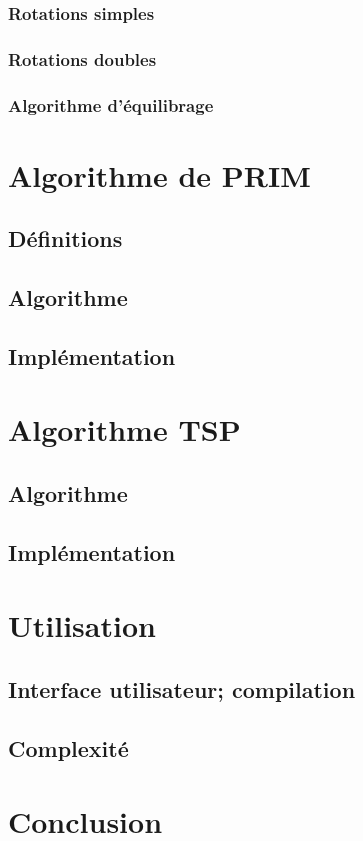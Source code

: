 \documentclass{article}
\begin{document}
\subsubsection{Rotations simples}

\subsubsection{Rotations doubles}

\subsubsection{Algorithme d'équilibrage}

\section{Algorithme de PRIM}

\subsection{Définitions}

\subsection{Algorithme}

\subsection{Implémentation}

\section{Algorithme TSP}

\subsection{Algorithme}

\subsection{Implémentation}

\section{Utilisation}

\subsection{Interface utilisateur; compilation}

\subsection{Complexité}

\section*{Conclusion}



\end{document}
